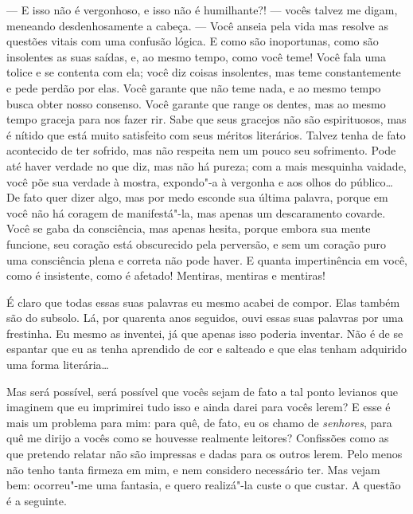 --- E isso não é vergonhoso, e isso não é humilhante?! --- vocês talvez me
digam, meneando desdenhosamente a cabeça. --- Você anseia pela vida mas
resolve as questões vitais com uma confusão lógica. E como são
inoportunas, como são insolentes as suas saídas, e, ao mesmo tempo,
como você teme! Você fala uma tolice e se contenta com ela; você diz
coisas insolentes, mas teme constantemente e pede perdão por elas. Você
garante que não teme nada, e ao mesmo tempo busca obter nosso consenso.
Você garante que range os dentes, mas ao mesmo tempo graceja para nos
fazer rir. Sabe que seus gracejos não são espirituosos, mas é nítido
que está muito satisfeito com seus méritos literários. Talvez tenha de
fato acontecido de ter sofrido, mas não respeita nem um pouco seu
sofrimento. Pode até haver verdade no que diz, mas não há pureza; com a
mais mesquinha vaidade, você põe sua verdade à mostra, expondo"-a à
vergonha e aos olhos do público\ldots{} De fato quer dizer algo, mas por
medo esconde sua última palavra, porque em você não há coragem de
manifestá"-la, mas apenas um descaramento covarde. Você se gaba da
consciência, mas apenas hesita, porque embora sua mente funcione, seu
coração está obscurecido pela perversão, e sem um coração puro uma
consciência plena e correta não pode haver. E quanta impertinência em
você, como é insistente, como é afetado! Mentiras, mentiras e mentiras!

É claro que todas essas suas palavras eu mesmo acabei de compor. Elas
também são do subsolo. Lá, por quarenta anos seguidos, ouvi essas suas
palavras por uma frestinha. Eu mesmo as inventei, já que apenas isso
poderia inventar. Não é de se espantar que eu as tenha aprendido de cor e salteado 
e que elas tenham adquirido uma forma literária\ldots{}

Mas será possível, será possível que vocês sejam de fato a tal ponto
levianos que imaginem que eu imprimirei tudo isso e ainda darei para
vocês lerem? E esse é mais um problema para mim: para quê, de fato, eu
os chamo de \textit{senhores}, para quê me dirijo a vocês como se houvesse
realmente leitores? Confissões como as que pretendo relatar não são
impressas e dadas para os outros lerem. Pelo menos não tenho tanta
firmeza em mim, e nem considero necessário ter. Mas vejam bem:
ocorreu"-me uma fantasia, e quero realizá"-la custe o que custar. A
questão é a seguinte.

